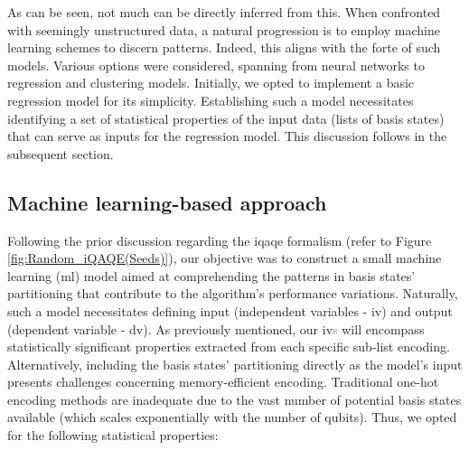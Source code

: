 As can be seen, not much can be directly inferred from this. When confronted with seemingly unstructured data, a natural progression is to employ machine learning schemes to discern patterns. Indeed, this aligns with the forte of such models. Various options were considered, spanning from neural networks to regression and clustering models. Initially, we opted to implement a basic regression model for its simplicity. Establishing such a model necessitates identifying a set of statistical properties of the input data (lists of basis states) that can serve as inputs for the regression model. This discussion follows in the subsequent section.

\subsection*{Machine learning-based approach}
Following the prior discussion regarding the \acrshort{iqaqe} formalism (refer to Figure \ref{fig:Random_iQAQE(Seeds)}), our objective was to construct a small machine learning (\acrshort{ml}) model aimed at comprehending the patterns in basis states' partitioning that contribute to the algorithm's performance variations. Naturally, such a model necessitates defining input (independent variables - \acrshort{iv}) and output (dependent variable - \acrshort{dv}). As previously mentioned, our \acrshort{iv}\textcolor{gray}{s} will encompass statistically significant properties extracted from each specific sub-list encoding. Alternatively, including the basis states' partitioning directly as the model's input presents challenges concerning memory-efficient encoding. Traditional one-hot encoding methods are inadequate due to the vast number of potential basis states available (which scales exponentially with the number of qubits). Thus, we opted for the following statistical properties:
